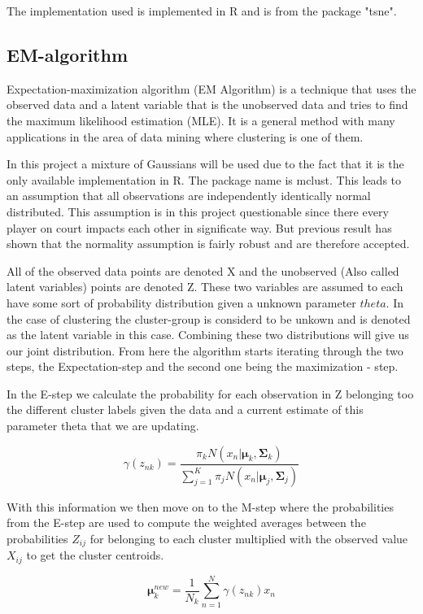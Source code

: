 \documentclass{article}
\begin{document}
The implementation used is implemented in R and is from the package "tsne".




\subsection{EM-algorithm}

Expectation-maximization algorithm (EM Algorithm) is a technique that uses the observed data and a latent variable that is the unobserved data and tries to find the maximum likelihood estimation (MLE). It is a general method with many applications in the area of data mining where clustering is one of them.

In this project a mixture of Gaussians will be used due to the fact that it is the only available implementation in R. The package name is mclust. This leads to an assumption that all observations are independently identically normal distributed. This assumption is in this project questionable since there every player on court impacts each other in significate way. But previous result has shown that the normality assumption is fairly robust and are therefore accepted.

All of the observed data points are denoted X and the unobserved (Also called latent variables) points are denoted Z. These two variables are assumed to each have some sort of probability distribution given a unknown parameter $theta$. In the case of clustering the cluster-group is considerd to be unkown and is denoted as the latent variable in this case. Combining these two distributions will give us our joint distribution. From here the algorithm starts iterating through the two steps, the Expectation-step and the second one being the maximization - step.

In the E-step we calculate the probability for each observation in Z belonging too the different cluster labels given the data and a current estimate of this parameter theta that we are updating.


$$\gamma(z_{nk}) = \frac{\pi_k N(x_n|\mathbf{\mu}_k,\mathbf{\Sigma}_k)} {\sum_{j=1}^{K}  \pi_jN(x_n|\mathbf{\mu}_j,\mathbf{\Sigma}_j)}$$

With this information we then move on to the M-step where the probabilities from the E-step are used to compute the weighted averages between the probabilities $Z_{ij}$ for belonging to each cluster multiplied with the observed value $X_{ij}$ to get the cluster centroids.

$$\mathbf{\mu}_k^{new} = \frac{1}{N_k} \sum_{n=1}^N\gamma(z_{nk})x_n$$
\end{document}
